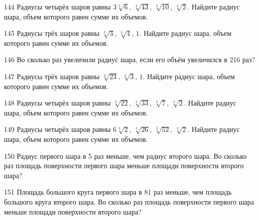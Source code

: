 \documentclass[a4paper]{article}
\begin{document}
\begin{taskBN}{144}
Радиусы четырёх шаров равны $3\sqrt[3]{6}$, $\sqrt[3]{43}$, $\sqrt[3]{10}$, $\sqrt[3]{2}$. Найдите радиус шара, объем которого равен сумме их объемов.
\end{taskBN}

\begin{taskBN}{145}
Радиусы трёх шаров равны $\sqrt[3]{3}$, $\sqrt[3]{4}$, $1$. Найдите радиус шара, объем которого равен сумме их объемов.
\end{taskBN}

\begin{taskBN}{146}
Во сколько раз увеличили радиус шара, если его объём увеличился в 216 раз?
\end{taskBN}

\begin{taskBN}{147}
Радиусы трёх шаров равны $\sqrt[3]{23}$, $\sqrt[3]{3}$, $1$. Найдите радиус шара, объем которого равен сумме их объемов.
\end{taskBN}

\begin{taskBN}{148}
Радиусы четырёх шаров равны $\sqrt[3]{22}$, $\sqrt[3]{33}$, $\sqrt[3]{7}$, $\sqrt[3]{2}$. Найдите радиус шара, объем которого равен сумме их объемов.
\end{taskBN}

\begin{taskBN}{149}
Радиусы четырёх шаров равны $6\sqrt[3]{2}$, $\sqrt[3]{26}$, $\sqrt[3]{52}$, $\sqrt[3]{2}$. Найдите радиус шара, объем которого равен сумме их объемов.
\end{taskBN}

\begin{taskBN}{150}
Радиус первого шара в 5 раз меньше, чем радиус второго шара. Во сколько раз площадь поверхности первого шара меньше площади поверхности второго шара?
\end{taskBN}

\begin{taskBN}{151}
Площадь большого круга первого шара в 81 раз меньше, чем площадь большого круга второго шара. Во сколько раз площадь поверхности первого шара меньше площади поверхности второго шара?
\end{taskBN}
\end{document}
